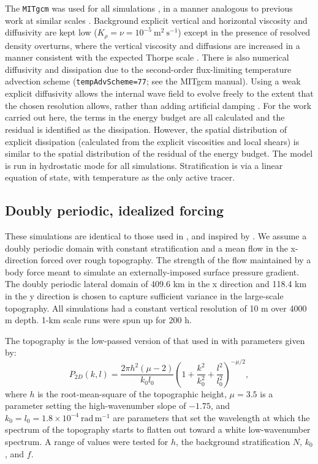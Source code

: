 \documentclass[twocol]{ametsocV5}
\begin{document}
The \verb+MITgcm+ was used for all simulations \citep{marshalletal97}, in a manner analogous to previous work at similar scales \citep{buijsmanetal14,klymaketal16b, klymak18}.  Background explicit vertical and horizontal viscosity and diffusivity are kept low ($K_{\rho} = \nu = 10^{-5}\ \mathrm{m^2\ s^{-1}}$) except in the presence of resolved density overturns, where the vertical viscosity and diffusions are increased in a manner consistent with the expected Thorpe scale \citep{klymaklegg10}.  There is also numerical diffusivity and dissipation due to the second-order flux-limiting temperature advection scheme (\verb+tempAdvScheme=77+; see the MITgcm manual).  Using a weak explicit diffusivity allows the internal wave field to evolve freely to the extent that the chosen resolution allows, rather than adding artificial damping \citep{ShakespeareHogg17}.  For the work carried out here, the terms in the energy budget are all calculated and the residual is identified as the dissipation.  However, the spatial distribution of explicit dissipation (calculated from the explicit viscosities and local shears) is similar to the spatial distribution of the residual of the energy budget.  The model is run in hydrostatic mode for all simulations.  Stratification is via a linear equation of state, with temperature as the only active tracer. 

\subsection{Doubly periodic, idealized forcing}

These simulations are identical to those used in \citet{klymak18}, and inspired by \citet{nikurashinferrari14}.  We assume a doubly periodic domain with constant stratification and a mean flow in the x-direction forced over rough topography.  The strength of the flow maintained by a body force meant to simulate an externally-imposed surface pressure gradient.  The doubly periodic lateral domain of 409.6 km in the x direction and 118.4 km in the y direction is chosen to capture sufficient variance in the large-scale topography. All simulations had a constant vertical resolution of 10 m over 4000 m depth.  1-km scale runs were spun up for 200 h.

The topography is the low-passed version of that used in \cite{klymak18} with parameters given by:
\begin{equation}
    P_{2D}(k,l) = \frac{2\pi h^2 \left(\mu-2 \right)}{k_0l_0}\left( 1 + \frac{k^2}{k_0^2} + \frac{l^2}{l_0^2}\right)^{-\mu/2} ,
    \label{eq:topo2d}
\end{equation}
where $h$ is the root-mean-square of the topographic height, $\mu=3.5$ is a parameter setting the high-wavenumber slope of $-1.75$, and $k_0=l_0 = 1.8\times10^{-4}\ \mathrm{rad\,m^{-1}}$ are parameters that set the wavelength at which the spectrum of the topography starts to flatten out toward a white low-wavenumber spectrum.  A range of values were tested for $h$, the background stratification $N$, $k_0$, and $f$.
\end{document}
